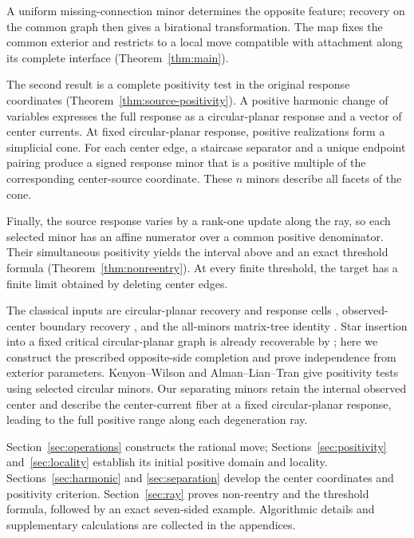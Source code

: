 \documentclass[11pt]{article}
\theoremstyle{definition}
\begin{document}
A uniform missing-connection minor determines the opposite feature;
recovery on the common graph then gives a birational transformation. The map fixes the common exterior and restricts to a local move compatible with attachment
along its complete interface (Theorem~\ref{thm:main}).

The second result is a complete positivity test in the original response
coordinates (Theorem~\ref{thm:source-positivity}). A positive harmonic change
of variables expresses the full response as a circular-planar response
and a vector of center currents. At fixed circular-planar response,
positive realizations form a simplicial cone. For each center edge,
a staircase separator and a unique endpoint pairing produce a signed
response minor that is a positive multiple of the corresponding
center-source coordinate. These $n$ minors describe all facets of
the cone.

Finally, the source response varies by a rank-one update along the
ray, so each selected minor has an affine numerator over a common
positive denominator. Their simultaneous positivity yields the
interval above and an exact threshold formula
(Theorem~\ref{thm:nonreentry}). At every finite threshold, the target
has a finite limit obtained by deleting center edges.

The classical inputs are circular-planar recovery and response cells
\cite{CIM}, observed-center boundary recovery \cite{ABCC}, and the
all-minors matrix-tree identity \cite{Chaiken}.
Star insertion into a fixed critical circular-planar graph is already
recoverable by \cite[Theorem 6]{ABCC}; here we construct the prescribed
opposite-side completion and prove independence from exterior parameters.
Kenyon--Wilson \cite{KW} and Alman--Lian--Tran
\cite[Section 4]{ALT} give positivity tests using selected circular
minors. Our separating minors retain the internal observed center
and describe the center-current fiber at a fixed circular-planar
response, leading to the full positive range along each degeneration ray.

Section~\ref{sec:operations} constructs the rational move;
Sections~\ref{sec:positivity} and~\ref{sec:locality} establish its initial
positive domain and locality. Sections~\ref{sec:harmonic} and
\ref{sec:separation} develop the center coordinates and positivity
criterion. Section~\ref{sec:ray} proves non-reentry and the threshold
formula, followed by an exact seven-sided example. Algorithmic details
and supplementary calculations are collected in the appendices.
\end{document}
